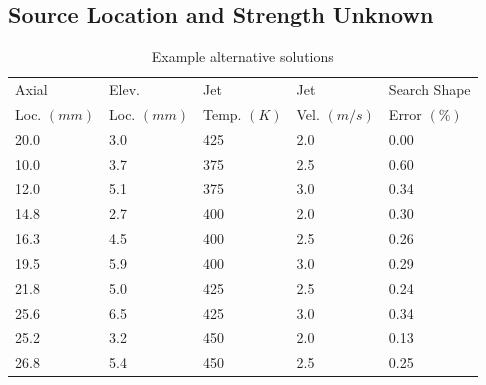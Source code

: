 \documentclass[preprint,12pt]{elsarticle}
\begin{document}
\subsection{Source Location and Strength Unknown}



\begin{table}[!t!b!p]
\begin{center}
\begin{tabular}{ l l l l l }
\hline
Axial    		& Elev.		& Jet		  	& Jet			& Search Shape \\
Loc. $(mm)$ & Loc. $(mm)$	& Temp. $(K)$ 	& Vel. $(m/s)$	& Error $(\%)$\\ \hline
20.0 &	3.0	&	425	&	2.0	&	0.00 \\ \hline
10.0 &  3.7 &	375 &	2.5 &	0.60 \\
12.0 &	5.1 &	375	&	3.0	&	0.34 \\
14.8 &	2.7 &	400	&	2.0	&	0.30 \\
16.3 &	4.5 &	400	&	2.5	&	0.26 \\
19.5 &	5.9 &	400	&	3.0	&	0.29 \\
21.8 &	5.0 &	425	&	2.5	&	0.24 \\
25.6 &	6.5 &	425	&	3.0	&	0.34 \\
25.2 &	3.2 &	450	&	2.0	&	0.13 \\
26.8 &	5.4 &	450	&	2.5	&	0.25 \\
\hline
\end{tabular}
\caption{Example alternative solutions}
\label{tab:alternatives}
\end{center}
\end{table}
\end{document}
